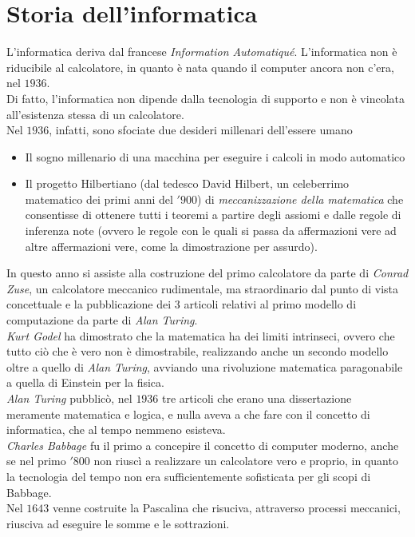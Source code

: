 \documentclass[a4paper]{extarticle}
\begin{document}
\newpage
\section{Storia dell'informatica}
L'informatica deriva dal francese \textit{Information Automatiqué}. L'informatica non è riducibile al calcolatore, in quanto è nata quando il computer ancora non c'era, nel \(1936\).\\
Di fatto, l'informatica non dipende dalla tecnologia di supporto e non è vincolata all'esistenza stessa di un calcolatore.\\
Nel \(1936\), infatti, sono sfociate due desideri millenari dell'essere umano
\begin{itemize}
    \item Il sogno millenario di una macchina per eseguire i calcoli in modo automatico
    \item Il progetto Hilbertiano (dal tedesco David Hilbert, un celeberrimo matematico dei primi anni del \('900\)) di \textit{meccanizzazione della matematica} che consentisse di ottenere tutti i teoremi a partire degli assiomi e dalle regole di inferenza note (ovvero le regole con le quali si passa da affermazioni vere ad altre affermazioni vere, come la dimostrazione per assurdo).
\end{itemize}
In questo anno si assiste alla costruzione del primo calcolatore da parte di \textit{Conrad Zuse}, un calcolatore meccanico rudimentale, ma straordinario dal punto di vista concettuale e la pubblicazione dei \(3\) articoli relativi al primo modello di computazione da parte di \textit{Alan Turing}.\\
\textit{Kurt Godel} ha dimostrato che la matematica ha dei limiti intrinseci, ovvero che tutto ciò che è vero non è dimostrabile, realizzando anche un secondo modello oltre a quello di \textit{Alan Turing}, avviando una rivoluzione matematica paragonabile a quella di Einstein per la fisica.\\
\textit{Alan Turing} pubblicò, nel \(1936\) tre articoli che erano una dissertazione meramente matematica e logica, e nulla aveva a che fare con il concetto di informatica, che al tempo nemmeno esisteva.\\
\textit{Charles Babbage} fu il primo a concepire il concetto di computer moderno, anche se nel primo \('800\) non riuscì a realizzare un calcolatore vero e proprio, in quanto la tecnologia del tempo non era sufficientemente sofisticata per gli scopi di Babbage.\\
Nel \(1643\) venne costruite la Pascalina che risuciva, attraverso processi meccanici, riusciva ad eseguire le somme e le sottrazioni.\\
\end{document}

